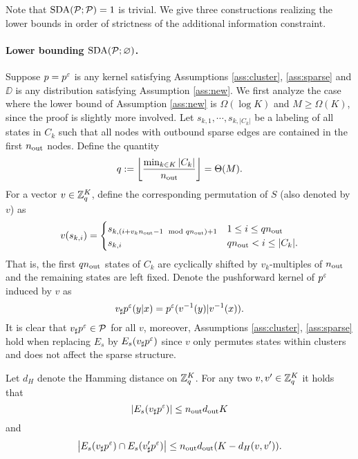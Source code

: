 Note that $\operatorname{SDA}(\mathcal{P};\mathcal{P})=1$ is trivial. We give three constructions realizing the lower bounds in order of strictness of the additional information constraint.


\paragraph{Lower bounding $\operatorname{SDA}(\mathcal{P};\varnothing)$.} Suppose $p=p^\varepsilon$ is any kernel satisfying Assumptions \ref{ass:cluster}, \ref{ass:sparse} and $\DD$ is any distribution satisfying Assumption \ref{ass:new}. We first analyze the case where the lower bound of Assumption \ref{ass:new} is $\Omega(\log K)$ and $M\ge\Omega(K)$, since the proof is slightly more involved. Let $s_{k,1},\cdots,s_{k,|C_k|}$ be a labeling of all states in $C_k$ such that all nodes with outbound sparse edges are contained in the first $n_{\operatorname{out}}$ nodes. Define the quantity
\begin{equation*}
q := \left\lfloor\frac{\min_{k\in K} |C_k|}{n_{\operatorname{out}}} \right\rfloor = \Theta(M).
\end{equation*}
For a vector $v\in\mathbb{Z}_q^K$, define the corresponding permutation of $S$ (also denoted by $v$) as
\begin{align*}
v(s_{k,i}) = \begin{cases}
s_{k,(i+v_k n_{\operatorname{out}}-1 \mod qn_{\operatorname{out}}) +1} & 1\le i\le qn_{\operatorname{out}}\\
s_{k,i} & qn_{\operatorname{out}} < i\le |C_k|.
\end{cases}
\end{align*}
That is, the first $qn_{\operatorname{out}}$ states of $C_k$ are cyclically shifted by $v_k$-multiples of $n_{\operatorname{out}}$ and the remaining states are left fixed. Denote the pushforward kernel of $p^\varepsilon$ induced by $v$ as
\begin{equation*}
v_\sharp p^\varepsilon(y|x) = p^\varepsilon(v^{-1}(y)|v^{-1}(x)).
\end{equation*}
It is clear that $v_\sharp p^\varepsilon\in\mathcal{P}$ for all $v$, moreover, Assumptions \ref{ass:cluster}, \ref{ass:sparse} hold when replacing $E_s$ by $E_s(v_\sharp p^\varepsilon)$ since $v$ only permutes states within clusters and does not affect the sparse structure.

\begin{lemma}\label{thm:hamming}
Let $d_H$ denote the Hamming distance on $\mathbb{Z}_q^K$. For any two $v,v'\in\mathbb{Z}_q^K$ it holds that
\begin{equation*}
    \left\lvert E_s(v_\sharp p^\varepsilon)\right\rvert \le n_{\operatorname{out}}d_{\operatorname{out}} K
\end{equation*}
and
\begin{equation*}
\left\lvert E_s(v_\sharp p^\varepsilon) \cap E_s(v'_\sharp p^\varepsilon)\right\rvert \le n_{\operatorname{out}}d_{\operatorname{out}} (K-d_H(v,v')).
\end{equation*}
\end{lemma}


